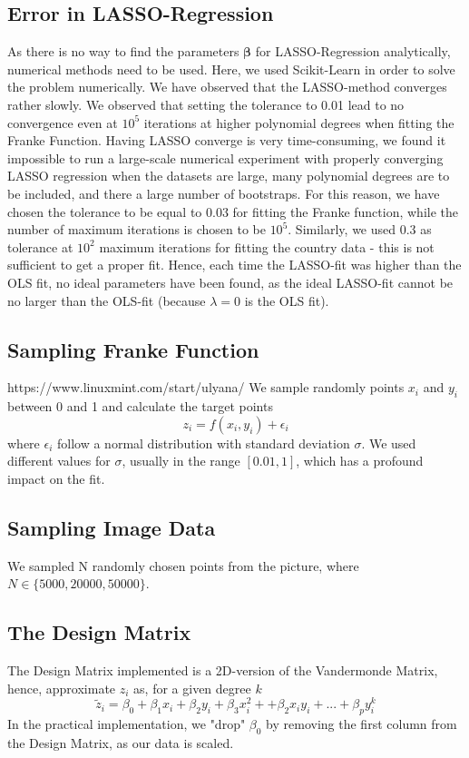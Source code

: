 \documentclass[11pt,a4paper,titlepage]{article}
\begin{document}
\subsection{Error in LASSO-Regression}
As there is no way to find the parameters $\bm{\beta}$ for LASSO-Regression analytically, numerical methods need to be used. Here, we used Scikit-Learn \citep{scikit-learn} in order to solve the problem numerically. We have observed that the LASSO-method converges rather slowly. We observed that setting the tolerance to 0.01 lead to no convergence even at $10^5$ iterations at higher polynomial degrees when fitting the Franke Function. Having LASSO converge is very time-consuming, we found it impossible to run a large-scale numerical experiment with properly converging LASSO regression when the datasets are large, many polynomial degrees are to be included, and there a large number of bootstraps. For this reason, we have chosen the tolerance to be equal to 0.03 for fitting the Franke function, while the number of maximum iterations is chosen to be $10^5$.  Similarly, we used 0.3 as tolerance at $10^2$ maximum iterations for fitting the country data - this is not sufficient to get a proper fit.  Hence, each time the LASSO-fit was higher than the OLS fit, no ideal parameters have been found, as the ideal LASSO-fit cannot be no larger than the OLS-fit (because $\lambda=0$ is the OLS fit).
\subsection{Sampling Franke Function}https://www.linuxmint.com/start/ulyana/
We sample randomly points $x_i$ and $y_i$ between 0 and 1 and calculate the target points
\begin{equation*}
z_i=f(x_i,y_i)+\epsilon_i
\end{equation*}
where $\epsilon_i$ follow a normal distribution with standard deviation $\sigma$. We used different values for $\sigma$, usually in the range $[0.01,1]$, which has a profound impact on the fit. 
\subsection{Sampling Image Data}
We sampled N randomly chosen points from the picture, where $N \in \{5000, 20000, 50000 \}$.
\subsection{The Design Matrix}
The Design Matrix implemented is a 2D-version of the Vandermonde Matrix, hence, approximate $z_i$ as, for a given degree $k$
\begin{equation*}
\tilde z_i=\beta_0+\beta_1x_i+\beta_2y_i+\beta_3x_i^2++\beta_2x_iy_i+...+\beta_py_i^k
\end{equation*}
In the practical implementation, we "drop" $\beta_0$ by removing the first column from the Design Matrix, as our data is scaled.
\end{document}
